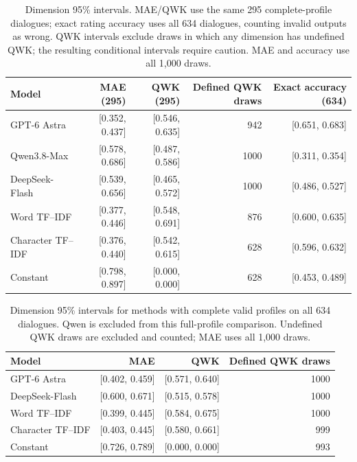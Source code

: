 \begin{table}[t]
\centering\small
\setlength{\tabcolsep}{4pt}
\begin{tabular}{@{}lrrrr@{}}
\toprule
Model & MAE (295) & QWK (295) & Defined QWK draws & Exact accuracy (634)\\
\midrule
GPT-6 Astra & [0.352, 0.437] & [0.546, 0.635] & 942 & [0.651, 0.683]\\
Qwen3.8-Max & [0.578, 0.686] & [0.487, 0.586] & 1000 & [0.311, 0.354]\\
DeepSeek-Flash & [0.539, 0.656] & [0.465, 0.572] & 1000 & [0.486, 0.527]\\
Word TF--IDF & [0.377, 0.446] & [0.548, 0.691] & 876 & [0.600, 0.635]\\
Character TF--IDF & [0.376, 0.440] & [0.542, 0.615] & 628 & [0.596, 0.632]\\
Constant & [0.798, 0.897] & [0.000, 0.000] & 628 & [0.453, 0.489]\\
\bottomrule
\end{tabular}
\caption{Dimension 95\% intervals. MAE/QWK use the same 295 complete-profile dialogues; exact rating accuracy uses all 634 dialogues, counting invalid outputs as wrong. QWK intervals exclude draws in which any dimension has undefined QWK; the resulting conditional intervals require caution. MAE and accuracy use all 1,000 draws.}
\label{tab:dimension_ci}
\end{table}
\begin{table}[t]
\centering\small
\setlength{\tabcolsep}{4pt}
\begin{tabular}{@{}lrrr@{}}
\toprule
Model & MAE & QWK & Defined QWK draws\\
\midrule
GPT-6 Astra & [0.402, 0.459] & [0.571, 0.640] & 1000\\
DeepSeek-Flash & [0.600, 0.671] & [0.515, 0.578] & 1000\\
Word TF--IDF & [0.399, 0.445] & [0.584, 0.675] & 1000\\
Character TF--IDF & [0.403, 0.445] & [0.580, 0.661] & 999\\
Constant & [0.726, 0.789] & [0.000, 0.000] & 993\\
\bottomrule
\end{tabular}
\caption{Dimension 95\% intervals for methods with complete valid profiles on all 634 dialogues. Qwen is excluded from this full-profile comparison. Undefined QWK draws are excluded and counted; MAE uses all 1,000 draws.}
\label{tab:dimension_full_ci}
\end{table}
